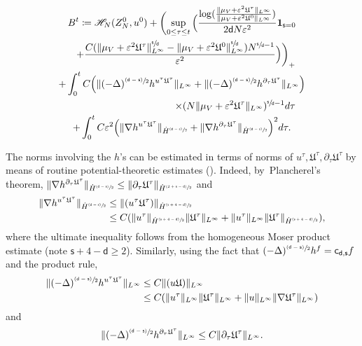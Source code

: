 \documentclass[10pt]{amsart}
\newcommand{\psfrac}[2]{\sfrac{(#1)}{#2}}
\theoremstyle{plain}
\theoremstyle{definition}
\DeclarePairedDelimiter{\pa}{\lparen}{\rparen}
\let\div\relax
\DeclareMathOperator{\div}{\mathrm{div}}
\let\vep\varepsilon
\let\nab\nabla
\let\p\partial
\let\uz Z
\newcommand{\indic}{\mathbf{1}}
\newcommand{\Uu}{\mathfrak{U}}
\renewcommand{\d}{\mathsf{d}}
\newcommand{\s}{\mathsf{s}}
\newcommand{\cd}{\mathsf{c}_{\mathsf{d},\mathsf{s}}}
\begin{document}
\begin{multline*}
B^t \coloneqq {\mathscr{H}_{N}(\uz_N^0,u^0)} + \biggl(\sup_{0\le\tau\le t}\Big(\frac{\log(\frac{\|\mu_V+\vep^2\Uu^\tau\|_{L^\infty}}{\|\mu_V+\vep^2\Uu^0\|_{L^\infty}})}{2\d N\vep^2}\indic_{\s=0} \\
\shoveright{+ \frac{C(\|\mu_V+\vep^2\Uu^\tau\|_{L^\infty}^{\sfrac{\s}{\d}} -\|\mu_V+\vep^2\Uu^0\|_{L^\infty}^{\sfrac{\s}{\d}}) N^{\sfrac{\s}{\d}-1}}{\vep^2}\Big)\biggr)_+} \\
+ \int_0^t C\pa*{\|(-\Delta)^{\psfrac{\d-\s}{2}}\div h^{u^\tau\Uu^\tau}\|_{L^\infty}+\|(-\Delta)^{\psfrac{\d-\s}{2}}h^{\p_\tau\Uu^\tau}\|_{L^\infty}}\\
\shoveright{\times(N\|{\mu_V+\vep^2\Uu^\tau}\|_{L^\infty})^{\sfrac{\s}{\d}-1}d\tau} \\
+\int_0^t C\vep^2\pa*{\|\nabla\div h^{u^\tau\Uu^\tau}\|_{\dot{H}^{\psfrac{\d-\s}{2}}} + \|\nabla h^{\p_\tau\Uu^\tau}\|_{\dot{H}^{\psfrac{\d-\s}{2}}}}^{ 2}d\tau.
\end{multline*}

The norms involving the $h$'s can be estimated in terms of norms of $u^\tau,\Uu^\tau,\p_\tau\Uu^\tau$ by means of routine potential-theoretic estimates (\cf \cite[Lem.\,4.3-4.4]{Rosenzweig2021ne}). Indeed, by~Plancherel's theorem, $\|\nabla h^{\p_\tau\Uu^\tau}\|_{\dot{H}^{\psfrac{\d-\s}{2}}} \leq \|\p_\tau\Uu^\tau\|_{\dot{H}^{\psfrac{2+\s-\d}{2}}}$ and
\begin{align*}
\|\nabla\div h^{u^\tau \Uu^\tau}\|_{\dot{H}^{\psfrac{\d-\s}{2}}} &\leq \|(u^\tau\Uu^\tau)\|_{\dot{H}^{\psfrac{\s+4-\d}{2}}}\\
&\leq C\pa*{\|u^\tau\|_{\dot{H}^{\psfrac{\s+4-\d}{2}}}\|\Uu^\tau\|_{L^\infty} + \|u^\tau\|_{L^\infty}\|\Uu^\tau\|_{\dot{H}^{\psfrac{\s+4-\d}{2}}}},
\end{align*}
where the ultimate inequality follows from the homogeneous Moser product estimate \cite[Cor.\,2.54]{BCD2011} (note $\s+4-\d\ge 2$). Similarly, using the fact that $(-\Delta)^{\psfrac{\d-\s}{2}}h^f = \cd f$ and the product rule,
\begin{align*}
\|(-\Delta)^{\psfrac{\d-\s}{2}}\div h^{u^\tau\Uu^\tau}\|_{L^\infty} &\le C\|\div(u\Uu)\|_{L^\infty}\\
&\le C(\|\div u^\tau\|_{L^\infty}\|\Uu^\tau\|_{L^\infty} + \|u\|_{L^\infty}\|\nab \Uu^\tau\|_{L^\infty})
\end{align*}
and
\begin{align*}
\|(-\Delta)^{\psfrac{\d-\s}{2}}h^{\p_\tau\Uu^\tau}\|_{L^\infty} \le C\|\p_\tau\Uu^\tau\|_{L^\infty}.
\end{align*}
\end{document}
